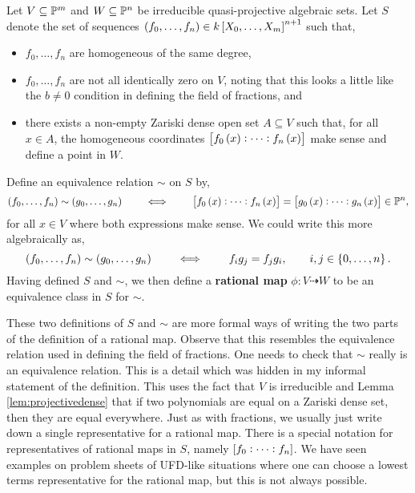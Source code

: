 \begin{definition*}
Let $ V \subseteq \mathbb{P}^m $ and $ W \subseteq \mathbb{P}^n $ be irreducible quasi-projective algebraic sets. Let $ S $ denote the set of sequences $ \br{f_0, \dots, f_n} \in k\sbr{X_0, \dots, X_m}^{n + 1} $ such that,
\begin{itemize}
\item $ f_0, \dots, f_n $ are homogeneous of the same degree,
\item $ f_0, \dots, f_n $ are not all identically zero on $ V $, noting that this looks a little like the $ b \ne 0 $ condition in defining the field of fractions, and
\item there exists a non-empty Zariski dense open set $ A \subseteq V $ such that, for all $ x \in A $, the homogeneous coordinates $ \sbr{f_0\br{x} : \dots : f_n\br{x}} $ make sense and define a point in $ W $.
\end{itemize}
Define an equivalence relation $ \sim $ on $ S $ by,
$$ \br{f_0, \dots, f_n} \sim \br{g_0, \dots, g_n} \qquad \iff \qquad \sbr{f_0\br{x} : \dots : f_n\br{x}} = \sbr{g_0\br{x} : \dots : g_n\br{x}} \in \PP^n, $$
for all $ x \in V $ where both expressions make sense. We could write this more algebraically as,
$$ \br{f_0, \dots, f_n} \sim \br{g_0, \dots, g_n} \qquad \iff \qquad f_ig_j = f_jg_i, \qquad i, j \in \cbr{0, \dots, n}. $$
Having defined $ S $ and $ \sim $, we then define a \textbf{rational map} $ \phi : V \dashrightarrow W $ to be an equivalence class in $ S $ for $ \sim $.
\end{definition*}

These two definitions of $ S $ and $ \sim $ are more formal ways of writing the two parts of the definition of a rational map. Observe that this resembles the equivalence relation used in defining the field of fractions. One needs to check that $ \sim $ really is an equivalence relation. This is a detail which was hidden in my informal statement of the definition. This uses the fact that $ V $ is irreducible and Lemma \ref{lem:projectivedense} that if two polynomials are equal on a Zariski dense set, then they are equal everywhere. Just as with fractions, we usually just write down a single representative for a rational map. There is a special notation for representatives of rational maps in $ S $, namely $ \sbr{f_0 : \dots : f_n} $. We have seen examples on problem sheets of UFD-like situations where one can choose a lowest terms representative for the rational map, but this is not always possible.


